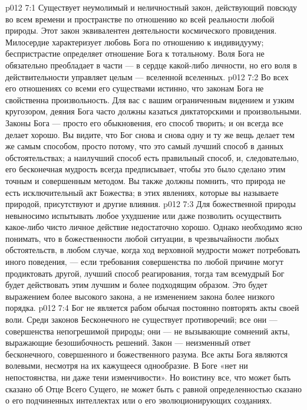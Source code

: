 \vs p012 7:1 Существует неумолимый и неличностный закон, действующий повсюду во всем времени и пространстве по отношению ко всей реальности любой природы. Этот закон эквивалентен деятельности космического провидения. Милосердие характеризует любовь Бога по отношению к индивидууму; беспристрастие определяет отношение Бога к тотальному. Воля Бога не обязательно преобладает в части --- в сердце какой\hyp{}либо личности, но его воля в действительности управляет целым --- вселенной вселенных.
\vs p012 7:2 \pc Во всех его отношениях со всеми его существами истинно, что законам Бога не свойственна произвольность. Для вас с вашим ограниченным видением и узким кругозором, деяния Бога часто должны казаться диктаторскими и произвольными. Законы Бога --- просто его обыкновения, его способ творить; и он всегда все делает хорошо. Вы видите, что Бог снова и снова одну и ту же вещь делает тем же самым способом, просто потому, что это самый лучший способ в данных обстоятельствах; а наилучший способ есть правильный способ, и, следовательно, его бесконечная мудрость всегда предписывает, чтобы это было сделано этим точным и совершенным методом. Вы также должны помнить, что природа не есть исключительный акт Божества; в этих явлениях, которые вы называете природой, присутствуют и другие влияния.
\vs p012 7:3 Для божественной природы невыносимо испытывать любое ухудшение или даже позволить осуществить какое\hyp{}либо чисто личное действие недостаточно хорошо. Однако необходимо ясно понимать, что  в божественности любой ситуации, в чрезвычайности любых обстоятельств, в любом случае, когда ход верховной мудрости может потребовать иного поведения, --- если требования совершенства по любой причине могут продиктовать другой, лучший способ реагирования, тогда там всемудрый Бог будет действовать этим лучшим и более подходящим образом. Это будет выражением более высокого закона, а не изменением закона более низкого порядка.
\vs p012 7:4 Бог не является рабом обычая постоянно повторять акты своей воли. Среди законов Бесконечного не существует противоречий; все они --- совершенства непогрешимой природы; они --- не вызывающие сомнений акты, выражающие безошибочность решений. Закон --- неизменный ответ бесконечного, совершенного и божественного разума. Все акты Бога являются волевыми, несмотря на их кажущееся однообразие. В Боге «нет ни непостоянства, ни даже тени изменчивости». Но воистину все, что может быть сказано об Отце Всего Сущего, не может быть с равной определенностью сказано о его подчиненных интеллектах или о его эволюционирующих созданиях.

